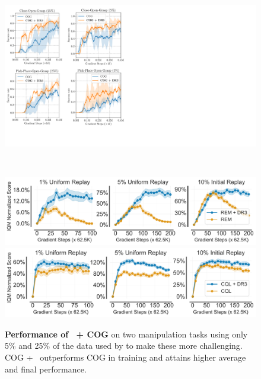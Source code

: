 \begin{figure}[t]
\centering
\begin{minipage}{.4\textwidth}
\includegraphics[width=0.96\linewidth]{chapters/dr3/figures/cog_plots.pdf}
\vspace{-0.2cm}
\caption{\footnotesize{\textbf{Performance of \drmethodname\ + COG} on two manipulation tasks using only 5\% and 25\% of the data used by \citet{singh2020cog} to make these more challenging.
COG + \drmethodname\  outperforms COG in training and attains higher average and final performance.}}
\label{fig:cog_figure}
\end{minipage}~~\vline~~
\begin{minipage}{.56\textwidth}
    \centering
    \includegraphics[width=0.99\linewidth]{chapters/dr3/figures/atari_new/IQM_rem_penalty.pdf}
    \includegraphics[width=0.99\linewidth]{chapters/dr3/figures/atari_new/IQM_cql_penalty.pdf}

\end{minipage}
\end{figure}
